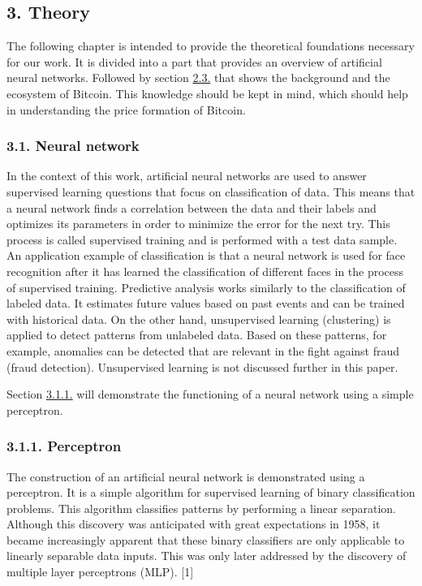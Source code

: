 \documentclass[
]{article}
\begin{document}
\newpage

\hypertarget{theory}{%
\subsection{3. Theory}\label{theory}}

The following chapter is intended to provide the theoretical foundations
necessary for our work. It is divided into a part that provides an
overview of artificial neural networks. Followed by section
\protect\hyperlink{bitcoin}{2.3.} that shows the background and the
ecosystem of Bitcoin. This knowledge should be kept in mind, which
should help in understanding the price formation of Bitcoin.

\hypertarget{neural_network}{%
\subsubsection{3.1. Neural network}\label{neural_network}}

In the context of this work, artificial neural networks are used to
answer supervised learning questions that focus on classification of
data. This means that a neural network finds a correlation between the
data and their labels and optimizes its parameters in order to minimize
the error for the next try. This process is called supervised training
and is performed with a test data sample. An application example of
classification is that a neural network is used for face recognition
after it has learned the classification of different faces in the
process of supervised training. Predictive analysis works similarly to
the classification of labeled data. It estimates future values based on
past events and can be trained with historical data. On the other hand,
unsupervised learning (clustering) is applied to detect patterns from
unlabeled data. Based on these patterns, for example, anomalies can be
detected that are relevant in the fight against fraud (fraud detection).
Unsupervised learning is not discussed further in this paper.

Section \protect\hyperlink{Perceptron}{3.1.1.} will demonstrate the
functioning of a neural network using a simple perceptron.

\hypertarget{perceptron}{%
\subsubsection{3.1.1. Perceptron}\label{perceptron}}

The construction of an artificial neural network is demonstrated using a
perceptron. It is a simple algorithm for supervised learning of binary
classification problems. This algorithm classifies patterns by
performing a linear separation. Although this discovery was anticipated
with great expectations in 1958, it became increasingly apparent that
these binary classifiers are only applicable to linearly separable data
inputs. This was only later addressed by the discovery of multiple layer
perceptrons (MLP). {[}1{]}
\end{document}
